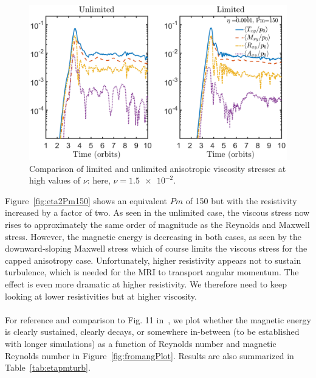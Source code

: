 \begin{figure}[H]
  \begin{center}  
    \includegraphics[width=\textwidth, angle=0.]{img/eta1-Pm150-Stresses-Abs.png}
  \end{center}
  \caption{Comparison of limited and unlimited anisotropic viscosity stresses at high values of $\nu$: here, $\nu=\num{1.5e-2}$.}
  \label{fig:eta1Pm150}
\end{figure}
%
\noindent Figure~\ref{fig:eta2Pm150} shows an equivalent $Pm$ of 150 but with the resistivity increased by a factor of two. As seen in the unlimited case, the viscous stress now rises to approximately the same order of magnitude as the Reynolds and Maxwell stress. However, the magnetic energy is decreasing in both cases, as seen by the downward-sloping Maxwell stress which of course limits the viscous stress for the capped anisotropy case. Unfortunately, higher resistivity appears not to sustain turbulence, which is needed for the MRI to transport angular momentum. The effect is even more dramatic at higher resistivity. We therefore need to keep looking at lower resistivities but at higher viscosity. \\
\\
For reference and comparison to Fig. 11 in~\citet{Fromang2007b}, we plot whether the magnetic energy is clearly sustained, clearly decays, or somewhere in-between (to be established with longer simulations) as a function of Reynolds number and magnetic Reynolds number in Figure~\ref{fig:fromangPlot}. Results are also summarized in Table~\ref{tab:etapmturb}.\\
\\
%
